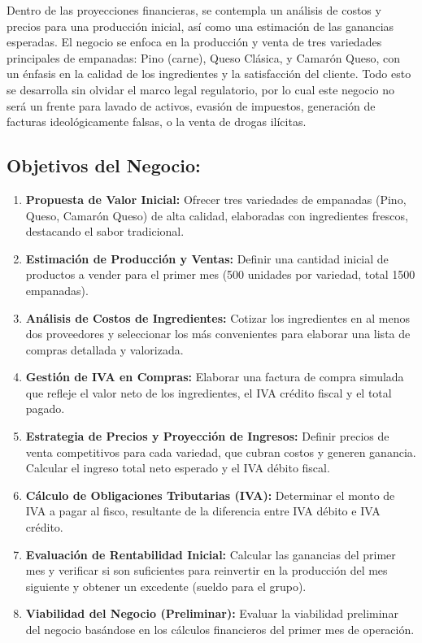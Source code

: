 \documentclass[12pt]{article}
\begin{document}
Dentro de las proyecciones financieras, se contempla un análisis de costos y precios para una producción inicial, así como una estimación de las ganancias esperadas. El negocio se enfoca en la producción y venta de tres variedades principales de empanadas: Pino (carne), Queso Clásica, y Camarón Queso, con un énfasis en la calidad de los ingredientes y la satisfacción del cliente. Todo esto se desarrolla sin olvidar el marco legal regulatorio, por lo cual este negocio no será un frente para lavado de activos, evasión de impuestos, generación de facturas ideológicamente falsas, o la venta de drogas ilícitas. \\ %


\subsection{Objetivos del Negocio:}
\begin{enumerate}
    \item \textbf{Propuesta de Valor Inicial:} Ofrecer tres variedades de empanadas (Pino, Queso, Camarón Queso) de alta calidad, elaboradas con ingredientes frescos, destacando el sabor tradicional.
    \item \textbf{Estimación de Producción y Ventas:} Definir una cantidad inicial de productos a vender para el primer mes (500 unidades por variedad, total 1500 empanadas).
    \item \textbf{Análisis de Costos de Ingredientes:} Cotizar los ingredientes en al menos dos proveedores y seleccionar los más convenientes para elaborar una lista de compras detallada y valorizada.
    \item \textbf{Gestión de IVA en Compras:} Elaborar una factura de compra simulada que refleje el valor neto de los ingredientes, el IVA crédito fiscal y el total pagado.
    \item \textbf{Estrategia de Precios y Proyección de Ingresos:} Definir precios de venta competitivos para cada variedad, que cubran costos y generen ganancia. Calcular el ingreso total neto esperado y el IVA débito fiscal.
    \item \textbf{Cálculo de Obligaciones Tributarias (IVA):} Determinar el monto de IVA a pagar al fisco, resultante de la diferencia entre IVA débito e IVA crédito.
    \item \textbf{Evaluación de Rentabilidad Inicial:} Calcular las ganancias del primer mes y verificar si son suficientes para reinvertir en la producción del mes siguiente y obtener un excedente (sueldo para el grupo).
    \item \textbf{Viabilidad del Negocio (Preliminar):} Evaluar la viabilidad preliminar del negocio basándose en los cálculos financieros del primer mes de operación.

\end{enumerate}
\end{document}
